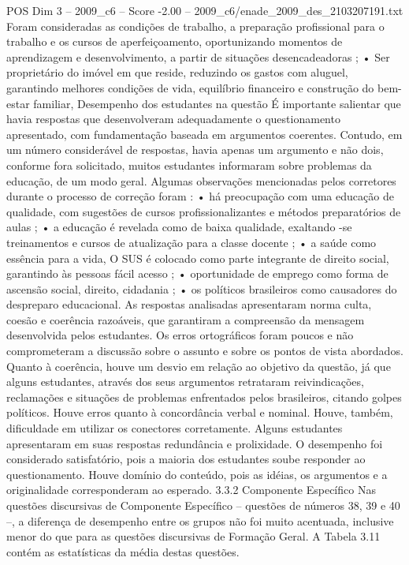 \begin{textsample}{POS Dim 3 – 2009\_c6 – Score -2.00 – 2009\_c6/enade\_2009\_des\_2103207191.txt}
Foram consideradas as condições de trabalho, a preparação profissional para o trabalho e os cursos de aperfeiçoamento, oportunizando momentos de aprendizagem e desenvolvimento, a partir de situações desencadeadoras ; • Ser proprietário do imóvel em que reside, reduzindo os gastos com aluguel, garantindo melhores condições de vida, equilíbrio financeiro e construção do bem-estar familiar, Desempenho dos estudantes na questão É importante salientar que havia respostas que desenvolveram adequadamente o questionamento apresentado, com fundamentação baseada em argumentos coerentes.
Contudo, em um número considerável de respostas, havia apenas um argumento e não dois, conforme fora solicitado, muitos estudantes informaram sobre problemas da educação, de um modo geral.
Algumas observações mencionadas pelos corretores durante o processo de correção foram : • há preocupação com uma educação de qualidade, com sugestões de cursos profissionalizantes e métodos preparatórios de aulas ; • a educação é revelada como de baixa qualidade, exaltando -se treinamentos e cursos de atualização para a classe docente ; • a saúde como essência para a vida, O SUS é colocado como parte integrante de direito social, garantindo às pessoas fácil acesso ; • oportunidade de emprego como forma de ascensão social, direito, cidadania ; • os políticos brasileiros como causadores do despreparo educacional.
As respostas analisadas apresentaram norma culta, coesão e coerência razoáveis, que garantiram a compreensão da mensagem desenvolvida pelos estudantes.
Os erros ortográficos foram poucos e não comprometeram a discussão sobre o assunto e sobre os pontos de vista abordados.
Quanto à coerência, houve um desvio em relação ao objetivo da questão, já que alguns estudantes, através dos seus argumentos retrataram reivindicações, reclamações e situações de problemas enfrentados pelos brasileiros, citando golpes políticos.
Houve erros quanto à concordância verbal e nominal.
Houve, também, dificuldade em utilizar os conectores corretamente.
Alguns estudantes apresentaram em suas respostas redundância e prolixidade.
O desempenho foi considerado satisfatório, pois a maioria dos estudantes soube responder ao questionamento.
Houve domínio do conteúdo, pois as idéias, os argumentos e a originalidade corresponderam ao esperado. 3.3.2 Componente Específico Nas questões discursivas de Componente Específico – questões de números 38, 39 e 40 –, a diferença de desempenho entre os grupos não foi muito acentuada, inclusive menor do que para as questões discursivas de Formação Geral.
A Tabela 3.11 contém as estatísticas da média destas questões.

\end{textsample}
